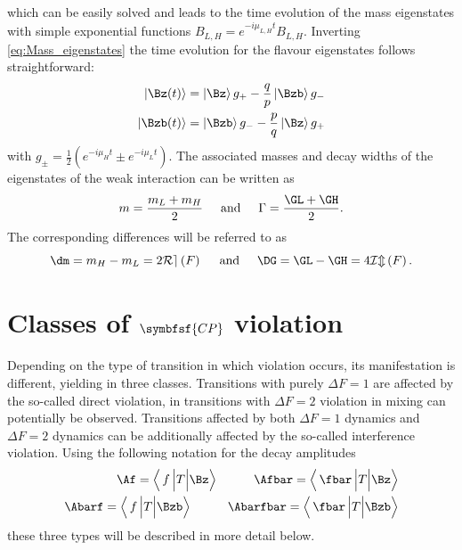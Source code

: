 which can be easily solved and leads to the time evolution of the mass eigenstates with simple exponential functions $B_{L,H}=e^{-i\mu_{L,H}t}B_{L,H}$.
Inverting \cref{eq:Mass_eigenstates} the time evolution for the flavour eigenstates follows straightforward:
\begin{equation}
\begin{split}
\left|\Bz\!\left(t\right)\right>&=\left|\Bz\right>g_+-\frac{q}{p}\left|\Bzb\right>g_-\\
\left|\Bzb\!\left(t\right)\right>&=\left|\Bzb\right>g_--\frac{p}{q}\left|\Bz\right>g_+ \label{eq:timeEvolution}
\end{split}
\end{equation}
with $g_\pm=\frac{1}{2}\left(e^{-i\mu_Ht}\pm e^{-i\mu_Lt}\right)$.
The associated masses and decay widths of the eigenstates of the weak interaction can be written as
\begin{equation}
m=\frac{m_L+m_H}{2}\hspace{0.5cm}\text{and}\hspace{0.5cm}\Gamma=\frac{\GL+\GH}{2}.
\end{equation}
The corresponding differences will be referred to as
\begin{equation}
\dm=m_H-m_L=2\mathcal{Re}\left(F\right)\hspace{0.5cm}\text{and}\hspace{0.5cm}\DG=\GL-\GH=4\mathcal{Im}\left(F\right).
\end{equation}

\section[head={Classes of \CP violation},tocentry={Classes of \CP violation}]{Classes of $\symbfsf{C{}P}$ violation}
\label{sec:CPVClasses}

Depending on the type of transition in which \CP violation occurs, its manifestation is different, yielding in three classes.
Transitions with purely $\Delta F=1$ are affected by the so-called direct \CP violation, in transitions with $\Delta F=2$ \CP violation in mixing can potentially be observed.
Transitions affected by both $\Delta F=1$ dynamics and $\Delta F=2$ dynamics can be additionally affected by the so-called interference \CP violation.
Using the following notation for the decay amplitudes
\begin{equation}
\begin{split}
\Af = \left<\,f\,\Big|T\Big|\Bz\right>\hspace{1cm}\Afbar = \left<\,\fbar\,\Big|T\Big|\Bz\right>\\
\Abarf = \left<\,f\,\Big|T\Big|\Bzb\right>\hspace{1cm}\Abarfbar = \left<\,\fbar\,\Big|T\Big|\Bzb\right>
\end{split}
\end{equation}
these three types will be described in more detail below.


